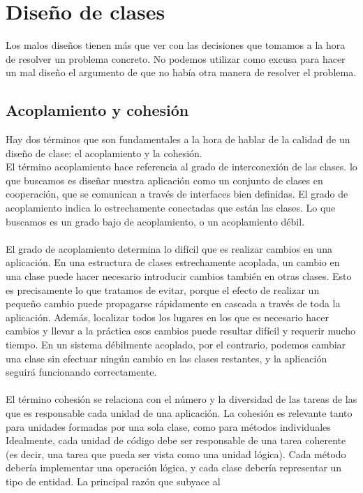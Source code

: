 \documentclass[11pt,a4paper]{article}
\begin{document}
\section{Diseño de clases}
Los malos diseños tienen más que ver con las decisiones que tomamos a la hora de resolver un
problema concreto. No podemos utilizar como excusa para hacer un mal diseño el argumento de
que no había otra manera de resolver el problema.
\subsection{Acoplamiento y cohesión}
Hay dos términos que son fundamentales a la hora de hablar de
la calidad de un diseño de clase: el acoplamiento y la cohesión.\\
El término acoplamiento hace referencia al grado de interconexión de las clases. lo que buscamos es diseñar nuestra aplicación como un conjunto de clases
en cooperación, que se comunican a través de interfaces bien definidas. El grado de acoplamiento
indica lo estrechamente conectadas que están las clases. Lo que buscamos es un grado bajo de
acoplamiento, o un acoplamiento débil.\\
\\
El grado de acoplamiento determina lo difícil que es realizar cambios en una aplicación. En una
estructura de clases estrechamente acoplada, un cambio en una clase puede hacer necesario introducir
cambios también en otras clases. Esto es precisamente lo que tratamos de evitar, porque el
efecto de realizar un pequeño cambio puede propagarse rápidamente en cascada a través de toda la
aplicación. Además, localizar todos los lugares en los que es necesario hacer cambios y llevar a
la práctica esos cambios puede resultar difícil y requerir mucho tiempo. En un sistema débilmente acoplado, por el contrario, podemos cambiar una clase sin efectuar ningún
cambio en las clases restantes, y la aplicación seguirá funcionando correctamente.\\
\\
El término cohesión se relaciona con el número y la diversidad de las tareas de las que es responsable
cada unidad de una aplicación. La cohesión es relevante tanto para unidades formadas por una
sola clase, como para métodos individuales\\
Idealmente, cada unidad de código debe ser responsable de una tarea coherente (es decir, una tarea
que pueda ser vista como una unidad lógica). Cada método debería implementar una operación
lógica, y cada clase debería representar un tipo de entidad. La principal razón que subyace al
\end{document}
